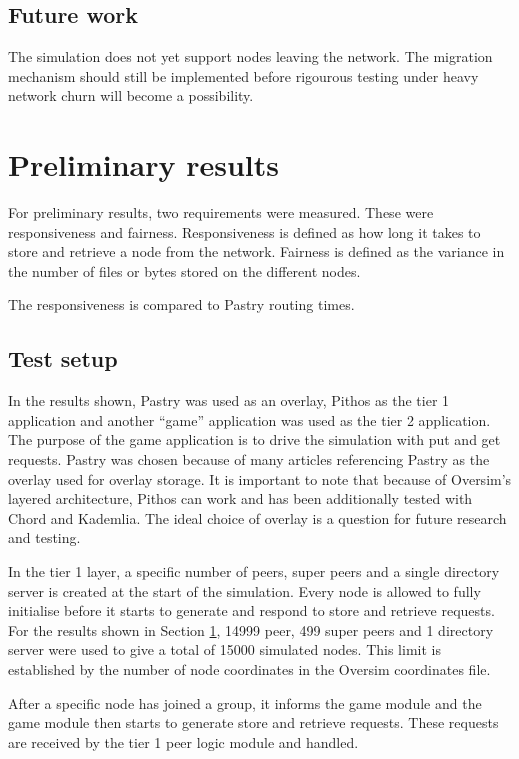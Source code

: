 \documentclass[10pt,a4paper,conference]{IEEEtran}
\begin{document}
\subsection{Future work}

The simulation does not yet support nodes leaving the network. The migration mechanism should still be implemented before rigourous testing under
heavy network churn will become a possibility.



\section{Preliminary results}
\label{results}

For preliminary results, two requirements were measured. These were responsiveness and fairness. Responsiveness is defined as how long it takes to
store and retrieve a node from the network. Fairness is defined as the variance in the number of files or bytes stored on the different nodes.

The responsiveness is compared to Pastry routing times.

\subsection{Test setup}
In the results shown, Pastry was used as an overlay, Pithos as the tier 1 application and another ``game'' application was used as the tier 2
application. The purpose of the game application is to drive the simulation with put and get requests. Pastry was chosen because of many articles
referencing Pastry as the overlay used for overlay storage. It is important to note that because of Oversim's layered architecture, Pithos can work
and has been additionally tested with Chord and Kademlia. The ideal choice of overlay is a question for future research and testing.

In the tier 1 layer, a specific number of peers, super peers and a single directory server is created at the start of the simulation. Every node is
allowed to fully initialise before it starts to generate and respond to store and retrieve requests. For the results shown in Section \ref{results},
14999 peer, 499 super peers and 1 directory server were used to give a total of 15000 simulated nodes. This limit is established by the number of
node coordinates in the Oversim coordinates file.

After a specific node has joined a group, it informs the game module and the game module then starts to generate store and retrieve requests. These
requests are received by the tier 1 peer logic module and handled.
\end{document}
